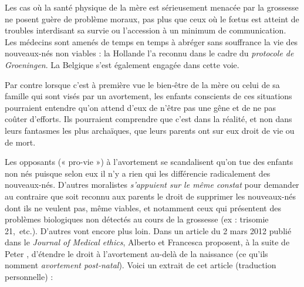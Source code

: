  Les cas où la santé physique de la mère est sérieusement menacée par la grossesse ne posent guère de problème moraux, pas plus que ceux où le fœtus est atteint de troubles interdisant sa survie ou l'accession à un minimum de communication. Les médecins sont amenés de temps en temps à abréger sans souffrance la vie des nouveaux-nés non viables : la Hollande l'a reconnu dans le cadre du \emph{protocole de Groeningen}. La Belgique s'est également engagée dans cette voie. 
 
 Par contre lorsque c'est à première vue le bien-être de la mère ou celui de sa famille qui sont visés par un avortement, les enfants conscients de ces situations pourraient entendre qu'on attend d'eux de n'être pas une gêne et de ne pas coûter d'efforts. Ils pourraient comprendre que c'est dans la réalité, et non dans leurs fantasmes les plus archaïques, que leurs parents ont sur eux droit de vie ou de mort.

 Les opposants (« pro-vie ») à l'avortement se scandalisent qu'on tue des enfants non nés puisque selon eux il n'y a rien qui les différencie radicalement des nouveaux-nés. D'autres moralistes \emph{s'appuient sur le même constat} pour demander au contraire que soit reconnu aux parents le droit de supprimer les nouveaux-nés dont ils ne veulent pas, même viables, et notamment ceux qui présentent des problèmes biologiques non détectés au cours de la grossesse (ex : trisomie 21,~etc.). D'autres vont encore plus loin. Dans un article du 2 mars 2012 publié dans le \emph{Journal of Medical ethics}, Alberto  et Francesca  proposent, à la suite de Peter , d'étendre le droit à l'avortement au-delà de la naissance (ce qu'ils nomment \emph{avortement post-natal}). Voici un extrait de cet article (traduction personnelle) :

